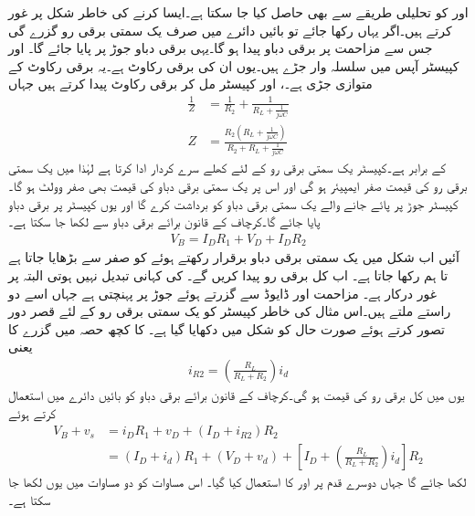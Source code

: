  اور  کو تحلیلی طریقے سے بھی حاصل کیا جا سکتا ہے۔ایسا کرنے کی خاطر شکل  پر غور کرتے ہیں۔اگر یہاں  رکھا جائے تو بائیں دائرے میں صرف یک سمتی برقی رو  گزرے گی جس سے مزاحمت  پر برقی دباو  پیدا ہو گا۔یہی برقی دباو جوڑ  پر پایا جائے گا۔ اور کپیسٹر  آپس میں سلسلہ وار جڑے ہیں۔یوں ان کی برقی رکاوٹ  ہے۔یہ برقی رکاوٹ  کے متوازی جڑی ہے۔، اور کپیسٹر مل کر برقی رکاوٹ  پیدا کرتے ہیں جہاں
\begin{align}
\frac{1}{Z}&=\frac{1}{R_2}+\frac{1}{R_L+\frac{1}{j \omega C}}\\
Z&=\frac{R_2 \left(R_L+\frac{1}{j \omega C} \right)}{R_2+R_L+\frac{1}{j \omega C}}
\end{align}
کے برابر ہے۔کپیسٹر یک سمتی برقی رو کے لئے کھلے سرے کردار ادا کرتا ہے لہٰذا  میں یک سمتی برقی رو کی قیمت صفر ایمپیئر ہو گی اور اس پر یک سمتی برقی دباو کی قیمت بھی صفر وولٹ ہو گا۔کپیسٹر  جوڑ  پر پائے جانے والے یک سمتی برقی دباو کو برداشت کرے گا اور یوں کپیسٹر پر  برقی دباو پایا جائے گا۔کرچاف کے قانون برائے برقی دباو سے لکھا جا سکتا ہے۔
\begin{align} \label{مساوات_ٹرانزسٹر_یکسمتی_سپلائی_بار_مساوات_جزو}
V_B=I_D R_1+V_D+I_D R_2
\end{align}
آئیں اب شکل  میں یک سمتی برقی دباو  برقرار رکھتے ہوئے  کو صفر سے بڑھایا جاتا ہے تا ہم  رکھا جاتا ہے۔ اب کل برقی رو  پیدا کریں گے۔ کی کہانی تبدیل نہیں ہوتی البتہ  پر غور درکار ہے۔ مزاحمت  اور ڈایوڈ سے گزرتے ہوئے جوڑ  پر پہنچتی ہے جہاں اسے دو راستے ملتے ہیں۔اس مثال کی خاطر کپیسٹر کو یک سمتی برقی رو کے لئے قصر دور تصور کرتے ہوئے صورت حال کو شکل میں دکھایا گیا ہے۔ کا کچھ حصہ  میں گزرے کا یعنی
\begin{align}
i_{R2}=\left(\frac{R_L}{R_L+R_2}\right) i_d
\end{align}
یوں  میں کل برقی رو کی قیمت  ہو گی۔کرچاف کے قانون برائے برقی دباو کو بائیں دائرے میں استعمال کرتے ہوئے
\begin{align*}
V_B+v_s&=i_D R_1+v_D+\left(I_D+i_{R2} \right)R_2\\
&=\left(I_D+i_d \right)R_1+ \left(V_D+v_d \right)+\left[I_D+\left(\frac{R_L}{R_L+R_2}\right) i_d \right]R_2
\end{align*}
لکھا جائے گا جہاں دوسرے قدم پر  اور  کا استعمال کیا گیا۔ اس مساوات کو دو مساوات میں یوں لکھا جا سکتا ہے۔

